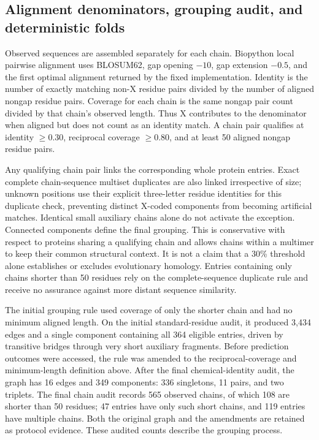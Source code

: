 \subsection{Alignment denominators, grouping audit, and deterministic folds}
\label{sec:fold_details}
Observed sequences are assembled separately for each chain. Biopython local pairwise alignment uses BLOSUM62, gap opening $-10$, gap extension $-0.5$, and the first optimal alignment returned by the fixed implementation. Identity is the number of exactly matching non-X residue pairs divided by the number of aligned nongap residue pairs. Coverage for each chain is the same nongap pair count divided by that chain's observed length. Thus X contributes to the denominator when aligned but does not count as an identity match. A chain pair qualifies at identity $\geq0.30$, reciprocal coverage $\geq0.80$, and at least 50 aligned nongap residue pairs.

Any qualifying chain pair links the corresponding whole protein entries. Exact complete chain-sequence multiset duplicates are also linked irrespective of size; unknown positions use their explicit three-letter residue identities for this duplicate check, preventing distinct X-coded components from becoming artificial matches. Identical small auxiliary chains alone do not activate the exception. Connected components define the final grouping. This is conservative with respect to proteins sharing a qualifying chain and allows chains within a multimer to keep their common structural context. It is not a claim that a 30\% threshold alone establishes or excludes evolutionary homology. Entries containing only chains shorter than 50 residues rely on the complete-sequence duplicate rule and receive no assurance against more distant sequence similarity.

The initial grouping rule used coverage of only the shorter chain and had no minimum aligned length. On the initial standard-residue audit, it produced 3,434 edges and a single component containing all 364 eligible entries, driven by transitive bridges through very short auxiliary fragments. Before prediction outcomes were accessed, the rule was amended to the reciprocal-coverage and minimum-length definition above. After the final chemical-identity audit, the graph has 16 edges and 349 components: 336 singletons, 11 pairs, and two triplets. The final chain audit records 565 observed chains, of which 108 are shorter than 50 residues; 47 entries have only such short chains, and 119 entries have multiple chains. Both the original graph and the amendments are retained as protocol evidence. These audited counts describe the grouping process.

